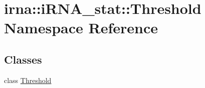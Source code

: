 \hypertarget{namespaceirna_1_1iRNA__stat_1_1Threshold}{
\section{irna\-:\-:i\-R\-N\-A\-\_\-stat\-:\-:\-Threshold \-Namespace \-Reference}
\label{namespaceirna_1_1iRNA__stat_1_1Threshold}
}
\subsection*{\-Classes}
\begin{DoxyCompactItemize}
\item 
class \hyperlink{classirna_1_1iRNA__stat_1_1Threshold_1_1Threshold}{\-Threshold}
\end{DoxyCompactItemize}
